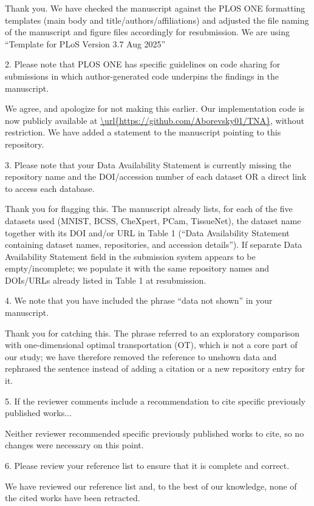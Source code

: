 \documentclass{article}
\newcommand{\response}[1]{\vspace*{1ex} \color{blue} \noindent #1 \color{black}
\vspace*{2ex}}
\begin{document}
\response{Thank you. We have checked the manuscript against the PLOS ONE formatting templates (main body and title/authors/affiliations) and adjusted the file naming of the manuscript and figure files accordingly for resubmission. We are using ``Template for PLoS Version 3.7 Aug 2025''}

2. Please note that PLOS ONE has specific guidelines on code sharing for submissions in which author-generated code underpins the findings in the manuscript.

\response{We agree, and apologize for not making this earlier. Our implementation code is now publicly available at \url{\url{https://github.com/Aborevsky01/TNA}}, without restriction. We have added a statement to the manuscript pointing to this repository.}

3. Please note that your Data Availability Statement is currently missing the repository name and the DOI/accession number of each dataset OR a direct link to access each database.

\response{Thank you for flagging this. The manuscript already lists, for each of the five datasets used (MNIST, BCSS, CheXpert, PCam, TissueNet), the dataset name together with its DOI and/or URL in Table 1 (``Data Availability Statement containing dataset names, repositories, and accession details''). If separate Data Availability Statement field in the submission system appears to be empty/incomplete; we populate it with the same repository names and DOIs/URLs already listed in Table 1 at resubmission.}

4. We note that you have included the phrase ``data not shown'' in your manuscript.

\response{Thank you for catching this. The phrase referred to an exploratory comparison with one-dimensional optimal transportation (OT), which is not a core part of our study; we have therefore removed the reference to unshown data and rephrased the sentence instead of adding a citation or a new repository entry for it.}

5. If the reviewer comments include a recommendation to cite specific previously published works...

\response{Neither reviewer recommended specific previously published works to cite, so no changes were necessary on this point.}

6. Please review your reference list to ensure that it is complete and correct.

\response{We have reviewed our reference list and, to the best of our knowledge, none of the cited works have been retracted. }
\end{document}
